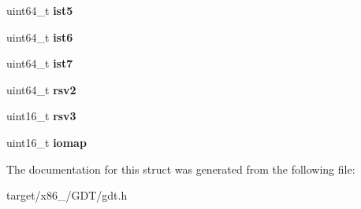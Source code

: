 \begin{DoxyCompactItemize}
\item 
uint64\+\_\+t {\bfseries ist5}\hypertarget{structtss__struct_a429a9a9001ceb431aa5e605ddd8554c1}{}\label{structtss__struct_a429a9a9001ceb431aa5e605ddd8554c1}

\item 
uint64\+\_\+t {\bfseries ist6}\hypertarget{structtss__struct_aab9aa6237d64838e3c368c17feb23db4}{}\label{structtss__struct_aab9aa6237d64838e3c368c17feb23db4}

\item 
uint64\+\_\+t {\bfseries ist7}\hypertarget{structtss__struct_af8894fedeeb2890a2eb2001298e8a878}{}\label{structtss__struct_af8894fedeeb2890a2eb2001298e8a878}

\item 
uint64\+\_\+t {\bfseries rsv2}\hypertarget{structtss__struct_a9ba3487c19259fe39bad5ba5bb11fc33}{}\label{structtss__struct_a9ba3487c19259fe39bad5ba5bb11fc33}

\item 
uint16\+\_\+t {\bfseries rsv3}\hypertarget{structtss__struct_a689a8345c617797b945ecc5862a05f8d}{}\label{structtss__struct_a689a8345c617797b945ecc5862a05f8d}

\item 
uint16\+\_\+t {\bfseries iomap}\hypertarget{structtss__struct_a099301c5ad9cc95e05f388b2c5d4d398}{}\label{structtss__struct_a099301c5ad9cc95e05f388b2c5d4d398}

\end{DoxyCompactItemize}


The documentation for this struct was generated from the following file\+:\begin{DoxyCompactItemize}
\item 
target/x86\+\_/\+G\+D\+T/gdt.\+h\end{DoxyCompactItemize}

